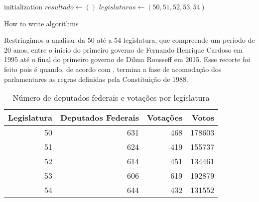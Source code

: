 \documentclass[a4paper,titlepage]{ppgi}\usepackage[]{graphicx}\usepackage[]{color}
\newenvironment{knitrout}{}{} %
\begin{document}
\begin{algorithm}[H]
 initialization\;
 $resultado \longleftarrow ()$\;
 $legislaturas \longleftarrow (50, 51, 52, 53, 54)$\;
 \caption{How to write algorithms}
\end{algorithm}


Restringimos a analisar da 50\textordfeminine{} até a 54\textordfeminine{}
legislatura, que compreende um período de 20 anos, entre o início do primeiro
governo de Fernando Henrique Cardoso em 1995 até o final do primeiro governo de
Dilma Rousseff em 2015. Esse recorte foi feito pois é quando, de acordo com
\cite{Freitas2008}, termina a fase de acomodação dos parlamentares as regras
definidas pela Constituição de 1988.

\begin{table}
\centering
\begin{knitrout}
\color{fgcolor}
\begin{tabular}{r|r|r|r}
\hline
Legislatura & Deputados Federais & Votações & Votos\\
\hline
50 & 631 & 468 & 178603\\
\hline
51 & 624 & 419 & 155737\\
\hline
52 & 614 & 451 & 134461\\
\hline
53 & 606 & 619 & 192879\\
\hline
54 & 644 & 432 & 131552\\
\hline
\end{tabular}


\end{knitrout}
\caption{Número de deputados federais e votações por legislatura}
\label{table:estatisticas-legislaturas}
\end{table}
\end{document}
